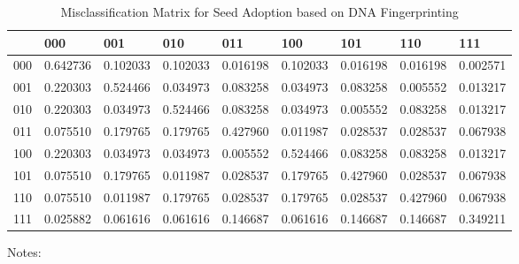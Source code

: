 \begin{table}
\caption{Misclassification Matrix for Seed Adoption based on DNA Fingerprinting}
\label{tab:cm}
\begin{tabular}{lllllllll}
\toprule
 & 000 & 001 & 010 & 011 & 100 & 101 & 110 & 111 \\
\midrule
000 & 0.642736 & 0.102033 & 0.102033 & 0.016198 & 0.102033 & 0.016198 & 0.016198 & 0.002571 \\
001 & 0.220303 & 0.524466 & 0.034973 & 0.083258 & 0.034973 & 0.083258 & 0.005552 & 0.013217 \\
010 & 0.220303 & 0.034973 & 0.524466 & 0.083258 & 0.034973 & 0.005552 & 0.083258 & 0.013217 \\
011 & 0.075510 & 0.179765 & 0.179765 & 0.427960 & 0.011987 & 0.028537 & 0.028537 & 0.067938 \\
100 & 0.220303 & 0.034973 & 0.034973 & 0.005552 & 0.524466 & 0.083258 & 0.083258 & 0.013217 \\
101 & 0.075510 & 0.179765 & 0.011987 & 0.028537 & 0.179765 & 0.427960 & 0.028537 & 0.067938 \\
110 & 0.075510 & 0.011987 & 0.179765 & 0.028537 & 0.179765 & 0.028537 & 0.427960 & 0.067938 \\
111 & 0.025882 & 0.061616 & 0.061616 & 0.146687 & 0.061616 & 0.146687 & 0.146687 & 0.349211 \\
\bottomrule
\end{tabular}
\begin{tablenotes}
    \item \footnotesize Notes:
\end{tablenotes}
\end{table}
